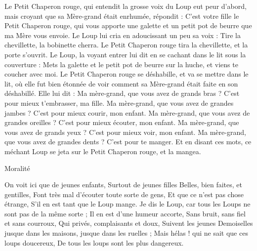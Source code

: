 \documentclass[a4paper,11pt]{article}
\begin{document}
Le Petit Chaperon rouge, qui entendit la grosse voix du Loup eut peur d'abord, mais croyant que sa Mère-grand était enrhumée, répondit : C'est votre fille le Petit Chaperon rouge, qui vous apporte une galette et un petit pot de beurre que ma Mère vous envoie. Le Loup lui cria en adoucissant un peu sa voix : Tire la chevillette, la bobinette cherra. Le Petit Chaperon rouge tira la chevillette, et la porte s'ouvrit. Le Loup, la voyant entrer lui dit en se cachant dans le lit sous la couverture : Mets la galette et le petit pot de beurre sur la huche, et viens te coucher avec moi. Le Petit Chaperon rouge se déshabille, et va se mettre dans le lit, où elle fut bien étonnée de voir comment sa Mère-grand était faite en son déshabillé. Elle lui dit : Ma mère-grand, que vous avez de grands bras ? C'est pour mieux t'embrasser, ma fille. Ma mère-grand, que vous avez de grandes jambes ? C'est pour mieux courir, mon enfant. Ma mère-grand, que vous avez de grandes oreilles ?
C'est pour mieux écouter, mon enfant. Ma mère-grand, que vous avez de grands yeux ? C'est pour mieux voir, mon enfant. Ma mère-grand, que vous avez de grandes dents ? C'est pour te manger. Et en disant ces mots, ce méchant Loup se jeta sur le Petit Chaperon rouge, et la mangea.

Moralité

On voit ici que de jeunes enfants, Surtout de jeunes filles Belles, bien faites, et gentilles, Font très mal d'écouter toute sorte de gens, Et que ce n'est pas chose étrange, S'il en est tant que le Loup mange.
Je dis le Loup, car tous les Loups ne sont pas de la même sorte ; Il en est d'une humeur accorte, Sans bruit, sans fiel et sans courroux, Qui privés, complaisants et doux, Suivent les jeunes Demoiselles jusque dans les maisons, jusque dans les ruelles ; Mais hélas ! qui ne sait que ces loups doucereux, De tous les loups sont les plus dangereux.
\end{document}
